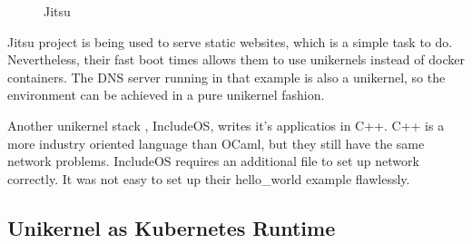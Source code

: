 \begin{figure}[h!]
\centering
\begin {sequencediagram}


\end {sequencediagram}
\caption{Jitsu \cite{jitsu}}\label{fig:jitsu}
\end{figure}

Jitsu project is being used to serve static websites, which is a simple task to do. Nevertheless, their fast boot times allows them to use unikernels instead of docker containers. The DNS server running in that example is also a unikernel, so the environment can be achieved in a pure unikernel fashion.

Another unikernel stack , IncludeOS, writes it's applicatios in C++. C++ is a more industry oriented language than OCaml, but they still have the same network problems. IncludeOS requires an additional file to set up network correctly. It was not easy to set up their hello\_world example flawlessly.
\pagebreak
\subsection{Unikernel as Kubernetes Runtime}

